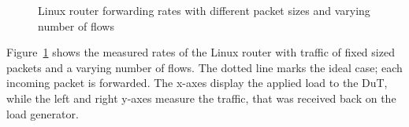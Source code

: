 \documentclass[IN,11pt,twoside,openright,master,english]{tumthesis}
\begin{document}
\begin{figure}[h]
	\centering
	
	
	\caption{Linux router forwarding rates with different packet sizes and varying number of flows}
	\label{fig:linux-router-variablebytes-variableflows}
\end{figure}


Figure~\ref{fig:linux-router-variablebytes-variableflows} shows the measured rates of the Linux router with traffic of fixed sized packets and a varying number of flows. The dotted line marks the ideal case; each incoming packet is forwarded. 
The x-axes display the applied load to the DuT, while the left and right y-axes measure the traffic, that was received back on the load generator.
\end{document}
